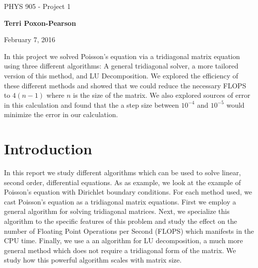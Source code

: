 \documentclass[%
oneside,                 %
final,                   %
10pt]{article}
\begin{document}

\newcommand{\exercisesection}[1]{\subsection*{#1}}






\thispagestyle{empty}

\begin{center}
{\LARGE\bf
\begin{spacing}{1.25}
PHYS 905 - Project 1
\end{spacing}
}
\end{center}


\begin{center}
{\bf Terri Poxon-Pearson}
\end{center}

    

\begin{center}
February 7, 2016
\end{center}

\vspace{1cm}

In this project we solved Poisson's equation via a tridiagonal matrix equation using three different algorithms:  A general tridiagonal solver, a more tailored version of this method, and LU Decomposition.  We explored the efficiency of these different methods and showed that we could reduce the necessary FLOPS to $4(n-1)$ where $n$ is the size of the matrix.  We also explored sources of error in this calculation and found that the a step size between $10^{-4}$ and $10^{-5}$ would minimize the error in our calculation.

\tableofcontents
 
\section{Introduction}
In this report we study different algorithms which can be used to solve linear, second order, differential equations.  As as example, we look at the example of Poisson's equation with Dirichlet boundary conditions.  For each method used, we cast Poisson's equation as a tridiagonal matrix equations.  First we employ a general algorithm for solving tridiagonal matrices.  Next, we specialize this algorithm to the specific features of this problem and study the effect on the number of Floating Point Operations per Second (FLOPS) which manifests in the CPU time.  Finally, we use a an algorithm for LU decomposition, a much more general method which does not require a tridiagonal form of the matrix.  We study how this powerful algorithm scales with matrix size.
\end{document}
